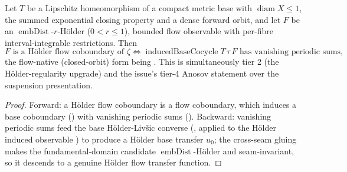 \begin{theorem}\label{livsic_holderFlow_constRoof}
  \leanok
  Let \(T\) be a Lipschitz homeomorphism of a compact metric base with \(\operatorname{diam} X\le 1\),
  the summed exponential closing property and a dense forward orbit, and let \(F\) be an
  \(\operatorname{embDist}\)-\(r\)-Hölder (\(0 < r\le 1\)), bounded flow observable with per-fibre
  interval-integrable restrictions. Then
  \[
    F \text{ is a Hölder flow coboundary of } \zeta
      \iff \operatorname{inducedBaseCocycle} T\,\tau\,F \text{ has vanishing periodic sums,}
  \]
  the flow-native (closed-orbit) form being
  . This is simultaneously tier 2 (the
  Hölder-regularity upgrade) and the issue's tier-4 Anosov statement over the suspension presentation.
\end{theorem}
\begin{proof}\leanok
  Forward: a Hölder flow coboundary is a flow coboundary, which induces a base coboundary
  () with vanishing periodic sums (). Backward:
  vanishing periodic sums feed the base Hölder-Livšic converse (, applied to
  the Hölder induced observable ) to produce a Hölder base transfer
  \(u_0\); the cross-seam gluing  makes the fundamental-domain candidate
  \(\operatorname{embDist}\)-Hölder and seam-invariant, so it descends to a genuine Hölder flow transfer
  function.
\end{proof}

